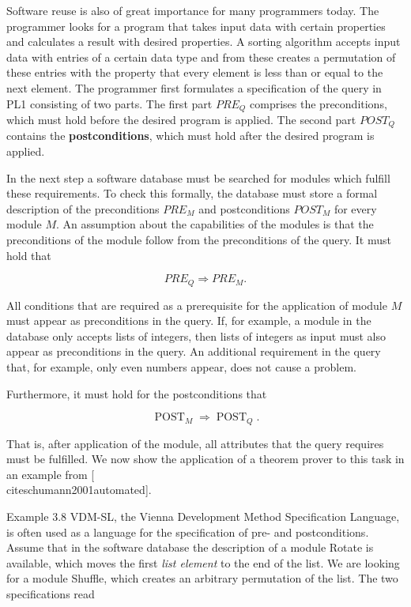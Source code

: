 \documentclass[10pt]{book}
\begin{document}
Software reuse is also of great importance for many programmers today. The programmer looks for a program that takes input data with certain properties and calculates a result with desired properties. A sorting algorithm accepts input data with entries of a certain data type and from these creates a permutation of these entries with the property that every element is less than or equal to the next element. The programmer first formulates a specification of the query in PL1 consisting of two parts. The first part $P R E_{Q}$ comprises the preconditions, which must hold before the desired program is applied. The second part $P O S T_{Q}$ contains the \textbf{postconditions}, which must hold after the desired program is applied.

In the next step a software database must be searched for modules which fulfill these requirements. To check this formally, the database must store a formal description of the preconditions $P R E_{M}$ and postconditions $P O S T_{M}$ for every module $M$. An assumption about the capabilities of the modules is that the preconditions of the module follow from the preconditions of the query. It must hold that

$$
P R E_{Q} \Rightarrow P R E_{M} .
$$

All conditions that are required as a prerequisite for the application of module $M$ must appear as preconditions in the query. If, for example, a module in the database only accepts lists of integers, then lists of integers as input must also appear as preconditions in the query. An additional requirement in the query that, for example, only even numbers appear, does not cause a problem.

Furthermore, it must hold for the postconditions that

$$
\operatorname{POST}_{M} \Rightarrow \operatorname{POST}_{Q} .
$$

That is, after application of the module, all attributes that the query requires must be fulfilled. We now show the application of a theorem prover to this task in an example from [\\cite{schumann2001automated}].

Example 3.8 VDM-SL, the Vienna Development Method Specification Language, is often used as a language for the specification of pre- and postconditions. Assume that in the software database the description of a module Rotate is available, which moves the first \textit{list element} to the end of the list. We are looking for a module Shuffle, which creates an arbitrary permutation of the list. The two specifications read
\end{document}
